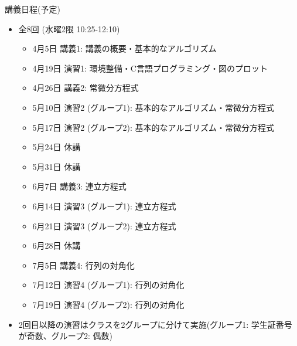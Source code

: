 \begin{frame}[t]{講義日程(予定)}
  \begin{itemize}
  \item 全8回 (水曜2限 10:25-12:10)
    \begin{itemize}
    \item 4月5日 講義1: 講義の概要・基本的なアルゴリズム
    \item 4月19日 演習1: 環境整備・C言語プログラミング・図のプロット \item 4月26日 講義2: 常微分方程式
    \item 5月10日 演習2 (グループ1): 基本的なアルゴリズム・常微分方程式
    \item 5月17日 演習2 (グループ2): 基本的なアルゴリズム・常微分方程式
    \item {\color{gray} 5月24日 休講}
    \item {\color{gray} 5月31日 休講}
    \item 6月7日 講義3: 連立方程式
    \item 6月14日 演習3 (グループ1): 連立方程式
    \item 6月21日 演習3 (グループ2): 連立方程式
    \item {\color{gray} 6月28日 休講}
    \item 7月5日 講義4: 行列の対角化
    \item 7月12日 演習4 (グループ1): 行列の対角化
    \item 7月19日 演習4 (グループ2): 行列の対角化
    \end{itemize}
  \item 2回目以降の演習はクラスを2グループに分けて実施(グループ1: 学生証番号が奇数、グループ2: 偶数)
  \end{itemize}
\end{frame}

